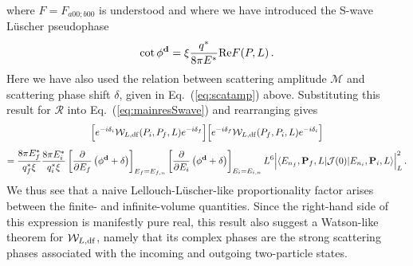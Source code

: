where $F = F_{a00;b00}$ is understood and where we have introduced the S-wave L\"uscher pseudophase
 \begin{equation}
 \cot \phi^{\textbf d} = \xi \frac{q^*}{8 \pi E^*} \mathrm{Re}F(P,L) \,.
 \end{equation}
Here we have also used the relation between scattering amplitude $\mathcal M$ and scattering phase shift $\delta$, given in Eq.~(\ref{eq:scatamp}) above. Substituting this result for $\mathcal R$ into Eq.~(\ref{eq:mainresSwave}) and rearranging gives
 \begin{multline}
 \label{eq:swaveWtoFV}
\Big [ e^{-i \delta_i}
{\mathcal{W}}_{L,{\rm df}}(P_i,P_f,L) e^{- i \delta_f} \Big ] \Big [ e^{- i \delta_f}  {\mathcal{W}}_{L,{\rm df}}(P_f,P_i,L) e^{- i \delta_i} \Big ]
\\[5pt] = \frac{8 \pi E^*_f}{q^*_f \xi} \frac{8 \pi E^*_i}{q^*_i \xi}  \left [  \frac{\partial}{\partial E_f} \left( \phi^\textbf{d} + \delta \right ) \right ]_{E_f=E_{f,n}} \left [  \frac{\partial}{\partial E_i} \left( \phi^\textbf{d} + \delta \right ) \right ]_{E_i=E_{i,n}} L^6 \Big | \langle E_{n_f}, \textbf P_f, L \vert  \mathcal J(0)  \vert E_{n_i}, \textbf P_i, L \rangle \Big |^2_L 
 \,.
\end{multline}
We thus see that a naive Lellouch-L\"uscher-like proportionality factor arises between the finite- and infinite-volume quantities. Since the right-hand side of this expression is manifestly pure real, this result also suggest a Watson-like theorem for ${\mathcal{W}}_{L,{\rm df}}$, namely that its complex phases are the strong scattering phases associated with the incoming and outgoing two-particle states. 
